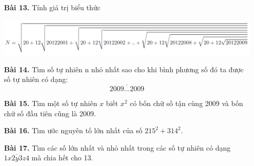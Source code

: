 \documentclass[12pt,a4paper]{article}
\begin{document}
\begin{enumerate}[label=\alph*.]
\begin{enumerate}
\end{enumerate}
\item[\textbf{Bài 13.}] Tính giá trị biểu thức
\begin{center}
    \includegraphics[scale=0.4]{Screenshot 2023-10-07 142830.png}
\end{center}
\item[\textbf{Bài 14.}] Tìm số tự nhiên n nhỏ nhất sao cho khi bình phương số đó ta được số tự nhiên có dạng: 
$$    \overline{2009...2009}   $$
\item[\textbf{Bài 15.}] Tìm một số tự nhiên $x$ biết $x^2$ có bốn chữ số tận cùng 2009 và bốn chữ số đầu tiên cũng là 2009. 
\item[\textbf{Bài 16.}] Tìm ước nguyên tố lớn nhất của số $215^2 + 314^2$.
\item[\textbf{Bài 17.}] Tìm các số lớn nhất và nhỏ nhất trong các số tự nhiên có dạng $\overline{1x2y3z4}$ mà chia hết cho 13.
\end{enumerate}
\newpage
\end{document}
